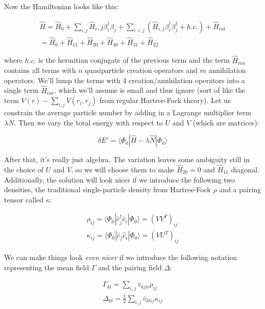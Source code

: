 \noindent Now the Hamiltonian looks like this:

\begin{eqnarray}
\hat{H} = \hat{H}_0 + \sum\limits_{i,j}\hat{H}_i,j\beta_i^\dagger\beta_j + \sum\limits_{i<j}(\hat{H}_{i,j}\beta_i^\dagger\beta_j^\dagger + h.c.) + \hat{H}_{int} \nonumber\\
= \hat{H}_0 + \hat{H}_{11} + \hat{H}_{20} + \hat{H}_{40} + \hat{H}_{31} + \hat{H}_{22}
\end{eqnarray}

\noindent where $h.c.$ is the hermitian conjugate of the previous term and the term $\hat{H}_{nm}$ contains all terms with $n$ quasiparticle creation operators and $m$ annihilation operators. We'll lump the terms with 4 creation/annhilation operators into a single term $\hat{H}_{int}$, which we'll assume is small and thus ignore (sort of like the term $V(r)-\sum_{i,j}V(r_i,r_j)$ from regular Hartree-Fock theory). Let us constrain the average particle number by adding in a Lagrange multiplier term $\lambda N$. Then we vary the total energy with respect to $U$ and $V$ (which are matrices):

\begin{equation}
\delta E' = \langle\Phi_0|\hat{H}-\lambda\hat{N}|\Phi_0\rangle
\end{equation}

After that, it's really just algebra. The variation leaves some ambiguity still in the choice of $U$ and $V$, so we will choose them to make $\hat{H}_{20}=0$ and $\hat{H}_{11}$ diagonal. Additionally, the solution will look nicer if we introduce the following two densities, the traditional single-particle density from Hartree-Fock $\rho$ and a pairing tensor called $\kappa$:

\begin{eqnarray}
\rho_{ij} = \langle\Phi_0|\hat{c}_j^\dagger\hat{c}_i|\Phi_0\rangle = (VV^T)_{ij} \\
\kappa_{ij} = \langle\Phi_0|\hat{c}_j\hat{c}_i|\Phi_0\rangle = (VU^T)_{ij}
\end{eqnarray}

We can make things look \textit{even nicer} if we introduce the following notation representing the mean field $\Gamma$ and the pairing field $\Delta$:

\begin{eqnarray}
\Gamma_{kl} = \sum_{i,j} \bar{v}_{kjli}\rho_{ij} \\
\Delta_{kl} = \frac{1}{2}\sum_{i,j} \bar{v}_{klij}\kappa_{ij}
\end{eqnarray}

